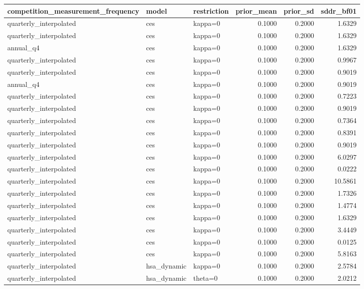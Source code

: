 \begin{tabular}{lllrrr}
\toprule
competition\_measurement\_frequency & model & restriction & prior\_mean & prior\_sd & sddr\_bf01 \\
\midrule
quarterly\_interpolated & ces & kappa=0 & 0.1000 & 0.2000 & 1.6329 \\
quarterly\_interpolated & ces & kappa=0 & 0.1000 & 0.2000 & 1.6329 \\
annual\_q4 & ces & kappa=0 & 0.1000 & 0.2000 & 1.6329 \\
quarterly\_interpolated & ces & kappa=0 & 0.1000 & 0.2000 & 0.9967 \\
quarterly\_interpolated & ces & kappa=0 & 0.1000 & 0.2000 & 0.9019 \\
annual\_q4 & ces & kappa=0 & 0.1000 & 0.2000 & 0.9019 \\
quarterly\_interpolated & ces & kappa=0 & 0.1000 & 0.2000 & 0.7223 \\
quarterly\_interpolated & ces & kappa=0 & 0.1000 & 0.2000 & 0.9019 \\
quarterly\_interpolated & ces & kappa=0 & 0.1000 & 0.2000 & 0.7364 \\
quarterly\_interpolated & ces & kappa=0 & 0.1000 & 0.2000 & 0.8391 \\
quarterly\_interpolated & ces & kappa=0 & 0.1000 & 0.2000 & 0.9019 \\
quarterly\_interpolated & ces & kappa=0 & 0.1000 & 0.2000 & 6.0297 \\
quarterly\_interpolated & ces & kappa=0 & 0.1000 & 0.2000 & 0.0222 \\
quarterly\_interpolated & ces & kappa=0 & 0.1000 & 0.2000 & 10.5861 \\
quarterly\_interpolated & ces & kappa=0 & 0.1000 & 0.2000 & 1.7326 \\
quarterly\_interpolated & ces & kappa=0 & 0.1000 & 0.2000 & 1.4774 \\
quarterly\_interpolated & ces & kappa=0 & 0.1000 & 0.2000 & 1.6329 \\
quarterly\_interpolated & ces & kappa=0 & 0.1000 & 0.2000 & 3.4449 \\
quarterly\_interpolated & ces & kappa=0 & 0.1000 & 0.2000 & 0.0125 \\
quarterly\_interpolated & ces & kappa=0 & 0.1000 & 0.2000 & 5.8163 \\
quarterly\_interpolated & hsa\_dynamic & kappa=0 & 0.1000 & 0.2000 & 2.5784 \\
quarterly\_interpolated & hsa\_dynamic & theta=0 & 0.1000 & 0.2000 & 2.0212 \\

\end{tabular}
